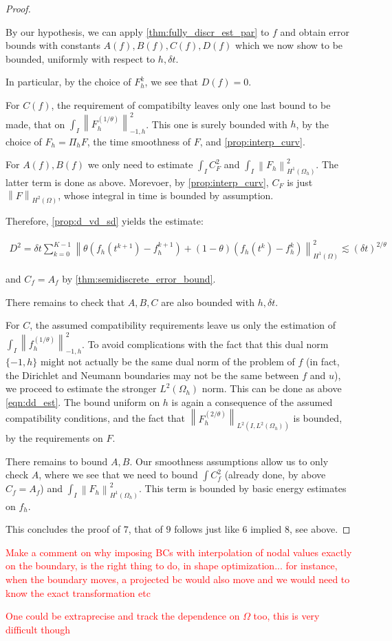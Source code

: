 \documentclass[english,a4paper,9pt,oneside]{scrbook}	%
\theoremstyle{break}
\newenvironment{mproof}[1][\proofname]{%
  \begin{proof}[#1]$ $\par\nobreak\ignorespaces
}{%
  \end{proof}
}
\renewcommand*{\proofname}{Proof}
\theoremstyle{remark}
\newcommand{\ds}{\displaystyle}
\newcommand{\norm}[1]{\left\lVert#1\right\rVert}
\begin{document}
\begin{appendices}
\begin{mproof}
By our hypothesis, we can apply \cref{thm:fully_discr_est_par} to $f$ and obtain error bounds with constants $A(f), B(f), C(f), D(f)$ which we now show to be bounded, uniformly with respect to $h, \delta t$.

In particular, by the choice of $F_h^k$, we see that $D(f)=0$.

For $C(f)$, the requirement of compatibilty leaves only one last bound to be made, that on $\ds \int_I\norm{F_h^{(1/\theta)}}_{-1,h}^2$. This one is surely bounded with $h$, by the choice of $F_h=\Pi_h F$, the time smoothness of $F$, and \cref{prop:interp_curv}.

For $A(f), B(f)$ we only need to estimate $\ds \int_I C_F^2$ and $\ds \int_I \norm{F_h}_{H^1(\Omega_h)}^2$. The latter term is done as above. Morevoer, by \cref{prop:interp_curv}, $C_F$ is just $\norm{F}_{H^2(\Omega)}$, whose integral in time is bounded by assumption.

Therefore, \cref{prop:d_vd_sd} yields the estimate:

\begin{align*}
	D^2 = \delta t \sum_{k=0}^{K-1} \norm{\theta(f_h(t^{k+1}) - f_h^{k+1}) + (1-\theta)(f_h(t^{k}) - f_h^{k})}_{H^1(\Omega)}^2 \lesssim (\delta t)^{2/\theta}
\end{align*}

and $C_f = A_f$ by \cref{thm:semidiscrete_error_bound}.

There remains to check that $A, B, C$ are also bounded with $h, \delta t$.

For $C$, the assumed compatibility requirements leave us only the estimation of $\ds\int_I\norm{f_h^{(1/\theta)}}_{-1,h}^2$. To avoid complications with the fact that  this dual norm $\{-1,h\}$ might not actually be the same dual norm of the problem of $f$ (in fact, the Dirichlet and Neumann boundaries may not be the same between $f$ and $u$), we proceed to estimate the stronger $L^2(\Omega_h)$ norm. This can be done as above \cref{eqn:dd_est}. The bound uniform on $h$ is again a consequence of the assumed compatibility conditions, and the fact that $\norm{F_h^{(2/\theta)}}_{L^2(I,L^2(\Omega_h))} $ is bounded, by the requirements on $F$.

There remains to bound $A, B$. Our smoothness assumptions allow us to only check $A$, where we see that we need to bound $\ds \int C_f^2$ (already done, by above $C_f=A_f$) and $\ds \int_I \norm{F_h}_{H^1(\Omega_h)}^2$. This term is bounded by basic energy estimates on $f_h$.

This concludes the proof of $7$, that of $9$ follows just like $6$ implied $8$, see above.

\end{mproof}

\textcolor{red}{Make a comment on why imposing BCs with interpolation of nodal values exactly on the boundary, is the right thing to do, in shape optimization... for instance, when the boundary moves, a projected bc would also move and we would need to know the exact transformation etc}

\textcolor{red}{One could be extraprecise and track the dependence on $\Omega$ too, this is very difficult though}
\end{appendices}

\printbibliography[title={Bibliography}]

\end{document}
